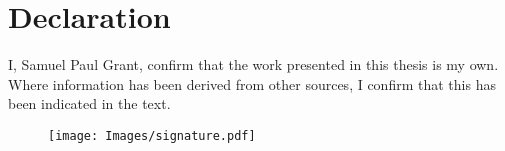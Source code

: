 \chapter*{Declaration}

I, Samuel Paul Grant, confirm that the work presented in this thesis is my own. Where information has been derived from other sources, I confirm that this has been indicated in the text.

\begin{figure}[h!]
\texttt{[image: Images/signature.pdf]}
\end{figure} 
